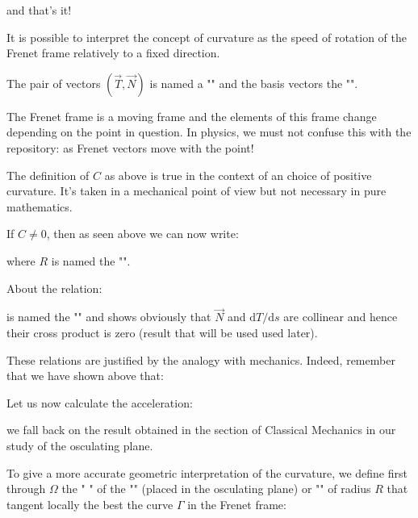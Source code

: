 {	and that's it!
	
	It is possible to interpret the concept of curvature as the speed of rotation of the Frenet frame relatively to a fixed direction.
	
	The pair of vectors $(\vec{T}, \vec{N})$ is named a "" and the basis vectors the "".
	
	The Frenet frame is a moving frame and the elements of this frame change depending on the point in question. In physics, we must not confuse this with the repository: as Frenet vectors move with the point!
	
	\begin{tcolorbox}[title=Remark,colframe=black,arc=10pt]
	The definition of $C$ as above is true in the context of an choice of positive curvature. It's taken in a mechanical point of view but not necessary in pure mathematics.
	\end{tcolorbox}	
	If $C\neq 0$, then as seen above we can now write:
	
	where $R$ is named the "\label{curvature radius}".
	
	About the relation:
	
	is named the "\label{first Frenet formula}" and shows obviously that $\vec{N}$ and $\mathrm{d}T/\mathrm{d}s$ are collinear and hence their cross product is zero (result that will be used used later).
	
	These relations are justified by the analogy with mechanics. Indeed, remember that we have shown above that:
	
	
	Let us now calculate the acceleration:
	
	we fall back on the result obtained in the section of Classical Mechanics in our study of the osculating plane.
	
	To give a more accurate geometric interpretation of the curvature, we define first through $\Omega$ the " \label{center of curvature}" of the "" (placed in the osculating plane) or "" of radius $R$ that tangent locally the best the curve $\Gamma$ in the Frenet frame:
	
}
